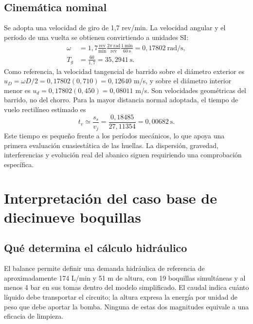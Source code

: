 \subsection{Cinemática nominal}
\label{sec:man-asp-cinematica}

Se adopta una velocidad de giro de 1,7 rev/min. La velocidad angular y
el período de una vuelta se obtienen convirtiendo a unidades SI:
\begin{align}
 \omega&=1{,}7\frac{\mathrm{rev}}{\mathrm{min}}
 \frac{2\pi\ \mathrm{rad}}{\mathrm{rev}}
 \frac{1\ \mathrm{min}}{60\ \mathrm{s}}
 =0{,}17802\ \mathrm{rad/s},\\
 T_g&=\frac{60}{1{,}7}=35{,}2941\ \mathrm{s}.
\end{align}
Como referencia, la velocidad tangencial de barrido sobre el diámetro
exterior es $u_D=\omega D/2=0{,}17802(0{,}710)=0{,}12640$ m/s, y sobre
el diámetro interior menor es $u_d=0{,}17802(0{,}450)=0{,}08011$ m/s.
Son velocidades geométricas del barrido, no del chorro. Para la mayor
distancia normal adoptada, el tiempo de vuelo rectilíneo estimado es
\begin{equation}
 t_v\simeq\frac{s_s}{v_j}
 =\frac{0{,}18485}{27{,}11354}
 =0{,}00682\ \mathrm{s}.
\end{equation}
Este tiempo es pequeño frente a los períodos mecánicos, lo que apoya
una primera evaluación cuasiestática de las huellas. La dispersión,
gravedad, interferencias y evolución real del abanico siguen requiriendo
una comprobación específica.
\fi

\ifdefined\AspersionSoloDiseno
\else
\section{Interpretación del caso base de diecinueve boquillas}
\label{sec:man-asp-interpretacion}

\subsection{Qué determina el cálculo hidráulico}

El balance permite definir una demanda hidráulica de referencia de
aproximadamente 174 L/min y 51 m de altura, con 19 boquillas simultáneas
y al menos 4 bar en sus tomas dentro del modelo simplificado. El caudal
indica cuánto líquido debe transportar el circuito; la altura expresa
la energía por unidad de peso que debe aportar la bomba. Ninguna de
estas dos magnitudes equivale a una eficacia de limpieza.

